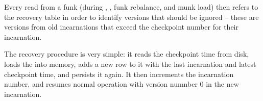 Every read from a funk  (during ,  , funk rebalance,  and munk load) then
refers to the recovery table in order to identify versions that should be ignored -- these are versions from old incarnations that exceed the checkpoint number for their incarnation. 

The recovery procedure is very simple: it reads the checkpoint time from disk, loads the  into memory, adds a new row to it with the last incarnation and latest checkpoint time, and persists it again. It then increments the incarnation number, and resumes normal operation with version numnber $0$ in the new incarnation.












